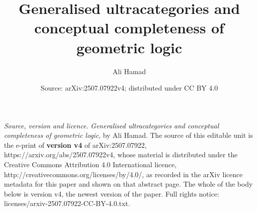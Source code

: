\documentclass[10pt,a4paper]{amsart}
\newtheorem*{Notation Convention*}{Notation Convention}
\begin{document}
\title{Generalised ultracategories and conceptual completeness of geometric logic}
\author{Ali Hamad}
\address{University of Ottawa}
\date{Source: arXiv:2507.07922v4; distributed under CC BY 4.0}
\maketitle
\noindent\emph{Source, version and licence.} \emph{Generalised ultracategories and conceptual completeness of geometric logic}, by Ali Hamad. The source of this editable unit is the e-print of \textbf{version v4} of arXiv:2507.07922, https://arxiv.org/abs/2507.07922v4, whose material is distributed under the Creative Commons Attribution 4.0 International licence, http://creativecommons.org/licenses/by/4.0/, as recorded in the arXiv licence metadata for this paper and shown on that abstract page. The whole of the body below is version v4, the newest version of the paper. Full rights notice: licenses/arxiv-2507.07922-CC-BY-4.0.txt.\par\smallskip
\end{document}

